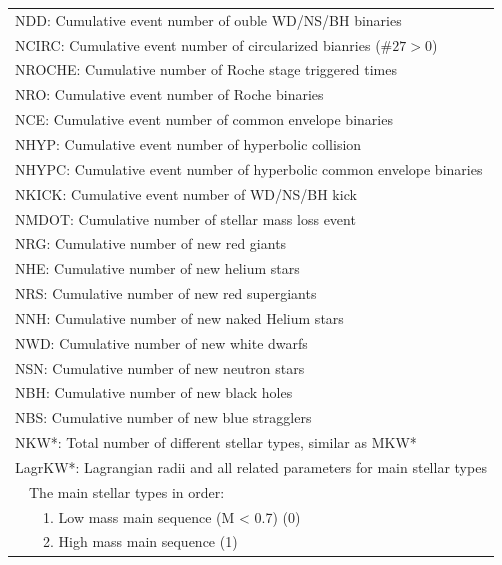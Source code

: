 \begin{longtable}{||p{0.42in}|p{0.25in}|p{0.6in}|p{0.6in}|p{0.4in}|p{2.3in}||}
\multicolumn{6}{|p{5.4in}|}{NDD:   Cumulative event number of ouble WD/NS/BH binaries}\\
\multicolumn{6}{|p{5.4in}|}{NCIRC: Cumulative event number of circularized bianries ($\#27>0$)}\\
\multicolumn{6}{|p{5.4in}|}{NROCHE: Cumulative number of Roche stage triggered times}\\
\multicolumn{6}{|p{5.4in}|}{NRO:   Cumulative event number of Roche binaries}\\
\multicolumn{6}{|p{5.4in}|}{NCE:   Cumulative event number of common envelope binaries}\\
\multicolumn{6}{|p{5.4in}|}{NHYP:  Cumulative event number of hyperbolic collision}\\
\multicolumn{6}{|p{5.4in}|}{NHYPC: Cumulative event number of hyperbolic common envelope binaries}\\
\multicolumn{6}{|p{5.4in}|}{NKICK: Cumulative event number of WD/NS/BH kick}\\
\multicolumn{6}{|p{5.4in}|}{NMDOT: Cumulative number of stellar mass loss event}\\
\multicolumn{6}{|p{5.4in}|}{NRG:   Cumulative number of new red giants}\\
\multicolumn{6}{|p{5.4in}|}{NHE:   Cumulative number of new helium stars}\\
\multicolumn{6}{|p{5.4in}|}{NRS:   Cumulative number of new red supergiants}\\
\multicolumn{6}{|p{5.4in}|}{NNH:   Cumulative number of new naked Helium stars}\\
\multicolumn{6}{|p{5.4in}|}{NWD:   Cumulative number of new white dwarfs}\\
\multicolumn{6}{|p{5.4in}|}{NSN:   Cumulative number of new neutron stars}\\
\multicolumn{6}{|p{5.4in}|}{NBH:   Cumulative number of new black holes}\\
\multicolumn{6}{|p{5.4in}|}{NBS:   Cumulative number of new blue stragglers}\\
\multicolumn{6}{|p{5.4in}|}{NKW*:  Total number of different stellar types, similar as MKW*}\\
\multicolumn{6}{|p{5.4in}|}{LagrKW*: Lagrangian radii and all related parameters for main stellar types}\\
\multicolumn{6}{|p{5.4in}|}{~~The main stellar types in order: }\\
\multicolumn{6}{|p{5.4in}|}{~~~~1. Low mass main sequence (M < 0.7) (0)}\\ 
\multicolumn{6}{|p{5.4in}|}{~~~~2. High mass main sequence  (1)        }\\ 

\end{longtable}
